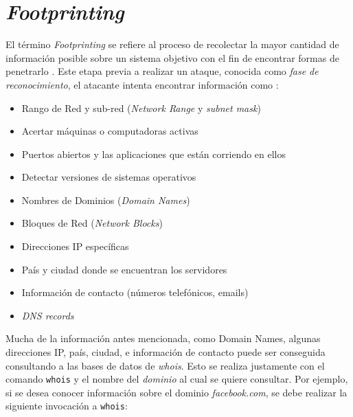 







\clearpage
\tableofcontents
\clearpage 

\lstset{style=bashstyle}

\section{\emph{Footprinting}}

El término \emph{Footprinting} se refiere al proceso de recolectar la mayor cantidad de información posible sobre un sistema objetivo con el fin de encontrar formas de penetrarlo \autocite{FootprintingOpenCampus}. Este etapa previa a realizar un ataque, conocida como \emph{fase de reconocimiento}, el atacante intenta encontrar información como \autocite{FootprintingCiberinformatico}:

\begin{itemize}
    \item Rango de Red y sub-red (\emph{Network Range} y \emph{subnet mask})
    \item Acertar máquinas o computadoras activas
    \item Puertos abiertos y las aplicaciones que están corriendo en ellos
    \item Detectar versiones de sistemas operativos
    \item Nombres de Dominios (\emph{Domain Names})
    \item Bloques de Red (\emph{Network Blocks})
    \item Direcciones IP específicas
    \item País y ciudad donde se encuentran los servidores
    \item Información de contacto (números telefónicos, emails)
    \item \emph{DNS records}
\end{itemize}

Mucha de la información antes mencionada, como Domain Names, algunas direcciones IP, país, ciudad, e información de contacto puede ser conseguida consultando a las bases de datos de \emph{whois}. Esto se realiza justamente con el comando \texttt{whois} y el nombre del \emph{dominio} al cual se quiere consultar. Por ejemplo, si se desea conocer información sobre el dominio \emph{facebook.com}, se debe realizar la siguiente invocación a \texttt{whois}:

